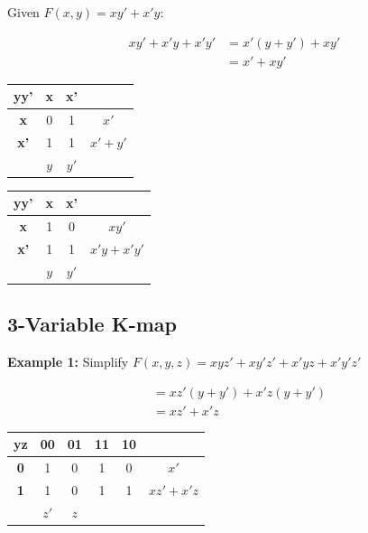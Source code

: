 \bigskip
\noindent Given $F(x,y) = xy' + x'y$:

\begin{align*}
    xy' + x'y + x'y' &= x'(y + y') + xy' \\
                    &= x' + xy'
\end{align*}

\begin{center}
\begin{tabular}{c|cc|c}
    \textbf{yy'} & \textbf{x} & \textbf{x'} & \\
    \hline
    \textbf{x}     & 0 & 1 & $x'$ \\
    \textbf{x'}    & 1 & 1 & $x' + y'$ \\
    \hline
               & $y$ & $y'$ & 
\end{tabular}
\qquad
\begin{tabular}{c|cc|c}
    \textbf{yy'} & \textbf{x} & \textbf{x'} & \\
    \hline
    \textbf{x}     & 1 & 0 & $xy'$ \\
    \textbf{x'}    & 1 & 1 & $x'y + x'y'$ \\
    \hline
               & $y$ & $y'$ & 
\end{tabular}
\end{center}

\subsection{3-Variable K-map}

\bigskip
\noindent\textbf{Example 1:} Simplify $F(x,y,z) = xyz' + xy'z' + x'yz + x'y'z'$

\begin{align*}
    &= xz'(y + y') + x'z(y + y') \\
    &= xz' + x'z
\end{align*}

\begin{center}
\begin{tabular}{c|cccc|c}
    \textbf{yz} & \textbf{00} & \textbf{01} & \textbf{11} & \textbf{10} & \\
    \hline
    \textbf{0} & 1          & 0          & 1          & 0          & $x'$ \\
    \textbf{1} & 1          & 0          & 1          & 1          & $xz' + x'z$ \\
    \hline
               & $z'$       & $z$        &            &            & 
\end{tabular}
\end{center}

